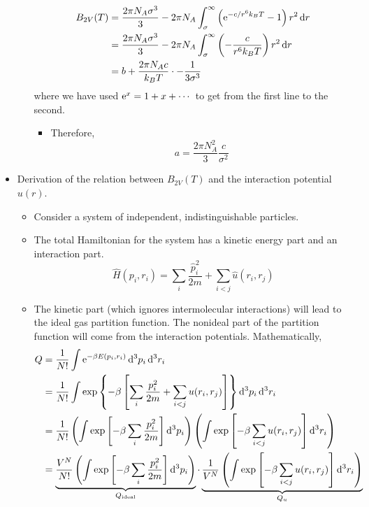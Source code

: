 \documentclass[../notes.tex]{subfiles}
\begin{document}
\begin{itemize}
\begin{itemize}
        \begin{align*}
            B_{2V}(T) &= \frac{2\pi N_A\sigma^3}{3}-2\pi N_A\int_\sigma^\infty\left( \e[-c/r^6k_BT]-1 \right)r^2\dd{r}\\
            &= \frac{2\pi N_A\sigma^3}{3}-2\pi N_A\int_\sigma^\infty\left( -\frac{c}{r^6k_BT} \right)r^2\dd{r}\\
            &= b+\frac{2\pi N_Ac}{k_BT}\cdot-\frac{1}{3\sigma^3}
        \end{align*}
        where we have used $\e[x]=1+x+\cdots$ to get from the first line to the second.
        \begin{itemize}
            \item Therefore,
            \begin{equation*}
                a = \frac{2\pi N_A^2}{3}\frac{c}{\sigma^2}
            \end{equation*}
        \end{itemize}
    \end{itemize}
    \item Derivation of the relation between $B_{2V}(T)$ and the interaction potential $u(r)$.
    \begin{itemize}
        \item Consider a system of independent, indistinguishable particles.
        \item The total Hamiltonian for the system has a kinetic energy part and an interaction part.
        \begin{equation*}
            \hat{H}(p_i,r_i) = \sum_i\frac{\hat{p}_i^2}{2m}+\sum_{i<j}\hat{u}(r_i,r_j)
        \end{equation*}
        \item The kinetic part (which ignores intermolecular interactions) will lead to the ideal gas partition function. The nonideal part of the partition function will come from the interaction potentials. Mathematically,
        \begin{align*}
            Q &= \frac{1}{N!}\int\e[-\beta E(p_i,r_i)]\dd[3]{p_i}\dd[3]{r_i}\\
            &= \frac{1}{N!}\int\exp\left\{ -\beta\left[ \sum_i\frac{p_i^2}{2m}+\sum_{i<j}u(r_i,r_j) \right] \right\}\dd[3]{p_i}\dd[3]{r_i}\\
            &= \frac{1}{N!}\left( \int\exp\left[ -\beta\sum_i\frac{p_i^2}{2m} \right]\dd[3]{p_i} \right)\left( \int\exp\left[ -\beta\sum_{i<j}u(r_i,r_j) \right]\dd[3]{r_i} \right)\\
            &= \underbrace{\frac{V^N}{N!}\left( \int\exp\left[ -\beta\sum_i\frac{p_i^2}{2m} \right]\dd[3]{p_i} \right)}_{Q_\text{ideal}}\cdot\underbrace{\frac{1}{V^N}\left( \int\exp\left[ -\beta\sum_{i<j}u(r_i,r_j) \right]\dd[3]{r_i} \right)}_{Q_u}

\end{align*}
\end{itemize}
\end{itemize}
\end{document}
